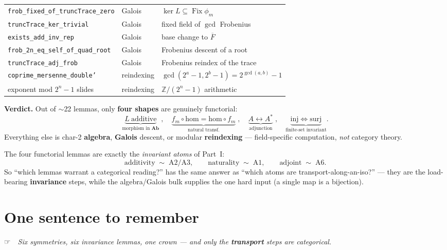 \documentclass[11pt]{article}
\newcommand{\ic}[1]{{\dingfont #1}}      %
\newcommand{\hand}{\ic{☞}}
\begin{document}
\begin{center}
\begin{tabular}{@{}p{4.7cm} p{3.1cm} p{4.6cm}@{}}
\hline
\texttt{frob\_fixed\_of\_truncTrace\_zero} & Galois & $\ker L\subseteq\operatorname{Fix}\phi_m$ \\
\texttt{truncTrace\_ker\_trivial} & Galois & fixed field of $\gcd$ Frobenius \\
\texttt{exists\_add\_inv\_rep} & Galois & base change to $\overline{F}$ \\
\texttt{frob\_2n\_eq\_self\_of\_quad\_root} & Galois & Frobenius descent of a root \\
\texttt{truncTrace\_adj\_frob} & Galois & Frobenius reindex of the trace \\
\hline
\texttt{coprime\_mersenne\_double'} & reindexing & $\gcd(2^a{-}1,2^b{-}1)=2^{\gcd(a,b)}{-}1$ \\
exponent mod $2^n{-}1$ slides & reindexing & $\mathbb{Z}/(2^n{-}1)$ arithmetic \\
\hline
\end{tabular}
\end{center}

\begin{bigidea}
\textbf{Verdict.} Out of $\sim$22 lemmas, only \textbf{four shapes} are genuinely
functorial:
\[
  \underbrace{L\ \text{additive}}_{\text{morphism in }\mathbf{Ab}}\;,\quad
  \underbrace{f_m\circ\text{hom}=\text{hom}\circ f_m}_{\text{natural transf.}}\;,\quad
  \underbrace{A\leftrightarrow A^{*}}_{\text{adjunction}}\;,\quad
  \underbrace{\mathrm{inj}\Leftrightarrow\mathrm{surj}}_{\text{finite-set invariant}}.
\]
Everything else is char-2 \textbf{algebra}, \textbf{Galois} descent, or
modular \textbf{reindexing} --- field-specific computation, \emph{not} category
theory.
\end{bigidea}

\begin{coolfact}
The four functorial lemmas are exactly the \emph{invariant atoms} of Part~I:
\[
  \text{additivity}\;\sim\;\text{A2/A3},\qquad
  \text{naturality}\;\sim\;\text{A1},\qquad
  \text{adjoint}\;\sim\;\text{A6}.
\]
So ``which lemmas warrant a categorical reading?'' has the same answer as
``which atoms are transport-along-an-iso?'' --- they are the load-bearing
\textbf{invariance} steps, while the algebra/Galois bulk supplies the one hard
input (a single map is a bijection).
\end{coolfact}

\section{One sentence to remember}

\begin{center}\large
\hand\ \ \emph{Six symmetries, six invariance lemmas, one crown ---
and only the \textbf{transport} steps are categorical.}
\end{center}
\end{document}
